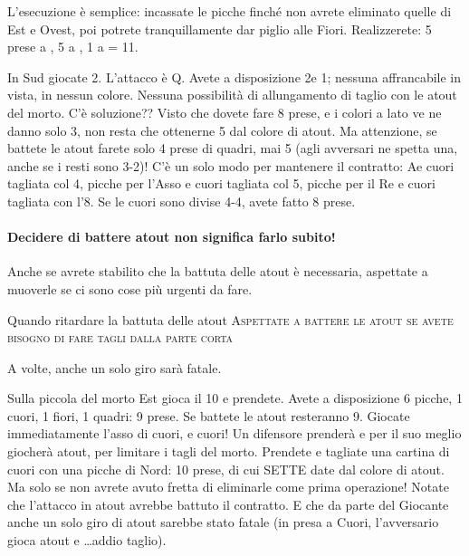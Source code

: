 \documentclass[../corsofiori.tex]{subfiles}
\begin{document}
L’esecuzione
è semplice: incassate le picche finché non avrete eliminato quelle di Est e Ovest, poi potrete tranquillamente dar
piglio alle Fiori.  Realizzerete: 5 prese a \Sp, 5 a \Cl, 1 a \He = 11. 

\newgame
{}
\leftupper{\boardtext*}%
{\dealertext\quad}{\vulnertext}

\showAll*

In Sud giocate 2\Di. L’attacco è Q\He.  Avete a disposizione 2\Sp e 1\He; nessuna affrancabile in vista, in nessun
colore. Nessuna possibilità di allungamento di taglio con le atout del morto. C’è soluzione?? Visto che dovete fare
8 prese, e i colori a lato ve ne danno solo 3, non resta che ottenerne 5 dal colore di atout. Ma attenzione, se battete
  le atout farete solo 4 prese di quadri, mai 5 (agli avversari ne spetta una, anche se i resti sono 3-2)! C’è un solo
  modo per mantenere il contratto: A\He e cuori tagliata col 4\Di, picche per l’Asso e cuori tagliata col 5\Di, picche
  per il Re e cuori tagliata con l’8\Di. Se le cuori sono divise 4-4, avete fatto 8 prese.

\paragraph{Decidere di battere atout non significa farlo subito!}
Anche se avrete stabilito che la battuta delle atout è necessaria, aspettate a
muoverle se ci sono cose più urgenti da fare.

\begin{regola}{Quando ritardare la battuta delle atout}
    \textsc{Aspettate a battere le atout se avete bisogno di fare tagli dalla parte corta}

\end{regola}

A volte, anche un solo giro sarà fatale.


\newgame
{}
\leftupper{\boardtext*}%
{\dealertext\quad}{\vulnertext}
\rightlower[2ex]{}{}{\lead: 2\Cl}

\showAll*

Sulla piccola del morto Est gioca il 10 e prendete. Avete a disposizione 6 picche, 1 cuori, 1 fiori,
1 quadri: 9 prese. Se battete le atout resteranno 9. Giocate immediatamente l’asso di cuori, e cuori! Un difensore
  prenderà e per il suo meglio giocherà atout, per limitare i tagli del morto. Prendete e tagliate una cartina di cuori
  con una picche di Nord: 10 prese, di cui SETTE date dal colore di atout. Ma solo se non avrete avuto fretta di
  eliminarle come prima operazione! Notate che l’attacco in atout avrebbe battuto il contratto. E che da parte del
  Giocante anche un solo giro di atout sarebbe stato fatale (in presa a Cuori, l’avversario gioca atout e \ldots addio
  taglio).
\end{document}
